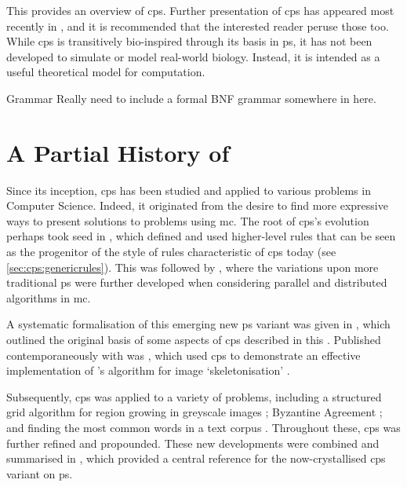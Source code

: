 This  provides an overview of \gls{cps}.  Further presentation of \gls{cps} has appeared most recently in \cite{Nicolescu2018,Henderson2019,Henderson2020,Liu2020,Liu2021}, and it is recommended that the interested reader peruse those too.  While \gls{cps} is transitively bio-inspired through its basis in \gls{ps}, it has not been developed to simulate or model real-world biology.  Instead, it is intended as a useful theoretical model for computation.

\begin{anfxwarning}{Grammar}
Really need to include a formal BNF grammar somewhere in here.
\end{anfxwarning}

\section{A Partial History of }

Since its inception, \gls{cps} has been studied and applied to various problems in Computer Science.  Indeed, it originated from the desire to find more expressive ways to present solutions to problems using \gls{mc}.  The root of \gls{cps}'s evolution perhaps took seed in \cite{Balanescu2011}, which defined and used higher-level rules that can be seen as the progenitor of the style of rules characteristic of \gls{cps} today (see \cref{sec:cps:genericrules}).  This was followed by \cite{Nicolescu2012}, where the variations upon more traditional \gls{ps} were further developed when considering parallel and distributed algorithms in \gls{mc}.

A systematic formalisation of this emerging new \gls{ps} variant was given in \cite{Nicolescu2014a}, which outlined the original basis of some aspects of \gls{cps} described in this .  Published contemporaneously with \cite{Nicolescu2014a} was \cite{Nicolescu2014}, which used \gls{cps} to demonstrate an effective implementation of \citeauthor{Guo1989}'s algorithm for image `skeletonisation' \cite{Guo1989}.

Subsequently, \gls{cps} was applied to a variety of problems, including a structured grid algorithm for region growing in greyscale images \cite{Nicolescu2015}; Byzantine Agreement \cite{Nicolescu2017}; and finding the most common words in a text corpus \cite{Nicolescu2018a}.  Throughout these, \gls{cps} was further refined and propounded.  These new developments were combined and summarised in \cite{Nicolescu2018}, which provided a central reference for the now-crystallised \gls{cps} variant on \gls{ps}.

